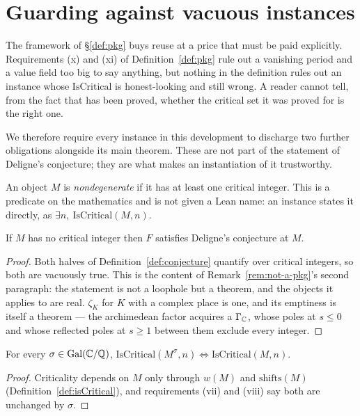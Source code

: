 \section{Guarding against vacuous instances}
\label{sec:guards}

The framework of \S\ref{def:pkg} buys reuse at a price that must be paid
explicitly. Requirements (x) and (xi) of Definition~\ref{def:pkg} rule out a vanishing period
and a value field too big to say anything, but nothing in the definition rules out an
instance whose $\mathrm{IsCritical}$ is
honest-looking and still wrong. A reader cannot tell, from the fact that 
has been proved, whether the critical set it was proved for is the right one.

We therefore require every instance in this development to discharge two further
obligations alongside its main theorem. These are not part of the statement of
Deligne's conjecture; they are what makes an instantiation of it trustworthy.

\begin{definition}[Nondegeneracy]
  \label{def:hasCriticalInteger}
  An object $M$ is \emph{nondegenerate} if it has at least one critical integer. This is a
  predicate on the mathematics and is not given a Lean name: an instance states it directly,
  as $\exists n,\ \mathrm{IsCritical}(M,n)$.
\end{definition}

\begin{theorem}
  \label{thm:vacuous-conjecture}
  \leanok
  If $M$ has no critical integer then $F$ satisfies Deligne's conjecture at $M$.
\end{theorem}
\begin{proof}
  \leanok
  Both halves of Definition~\ref{def:conjecture} quantify over critical integers, so both
  are vacuously true. This is the content of Remark~\ref{rem:not-a-pkg}'s second
  paragraph: the statement is not a loophole but a theorem, and the objects it applies to are
  real. $\zeta_K$ for $K$ with a complex place is one, and its emptiness is itself a theorem
  --- the archimedean factor acquires a $\Gamma_{\mathbb{C}}$, whose poles at $s \leq 0$ and whose
  reflected poles at $s \geq 1$ between them exclude every integer.
\end{proof}

\begin{lemma}
  \label{lem:isCritical-galois}
  \leanok
  For every $\sigma \in \operatorname{Gal}(\mathbb{C}/\mathbb{Q})$,
  $\mathrm{IsCritical}(M^{\sigma},n) \iff \mathrm{IsCritical}(M,n)$.
\end{lemma}
\begin{proof}
  \leanok
  Criticality depends on $M$ only through $w(M)$ and $\mathrm{shifts}(M)$
  (Definition~\ref{def:isCritical}), and requirements (vii) and (viii) say both are unchanged by
  $\sigma$.
\end{proof}

